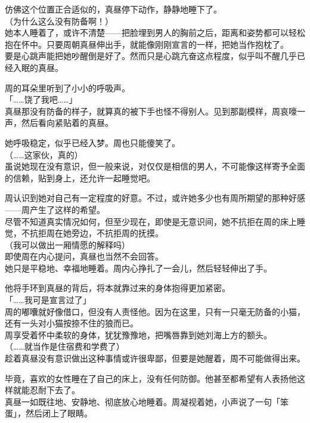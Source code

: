 仿佛这个位置正合适似的，真昼停下动作，静静地睡下了。\\

（为什么这么没有防备啊！）\\

她本人睡着了，或许不清楚——把脸埋到男人的胸前之后，距离和姿势都可以轻松抱在怀中。只要周朝真昼伸出手，就能像刚刚宣言的一样，把她当作抱枕了。\\

要是心跳声能把她吵醒倒是好了。然而只是心跳亢奋这点程度，似乎叫不醒几乎已经入眠的真昼。

周的耳朵里听到了小小的呼吸声。\\

「……饶了我吧……」\\

真昼那没有防备的样子，就算真的被下手也怪不得别人。见到那副模样，周哀嚎一声，然后看向紧贴着的真昼。

她呼吸稳定，似乎已经入梦。周也只能傻笑了。\\

（……这家伙，真的）\\

虽说她现在没有意识，但一般来说，对仅仅是相信的男人，不可能像这样寄予全面的信赖，贴到身上，还允许一起睡觉吧。

周认识到她对自己有一定程度的好意。不过，或许她多少也有周所期望的那种好感——周产生了这样的希望。\\

尽管不知道真实情况如何，但至少现在，即使是无意识间，她不抗拒在周的床上睡觉，不抗拒周在她旁边，不抗拒周的抚摸。\\

（我可以做出一厢情愿的解释吗）\\

即使周在内心提问，真昼也当然不会回答。\\

她只是平稳地、幸福地睡着。周内心挣扎了一会儿，然后轻轻伸出了手。

他将手环到真昼的背后，将本就靠过来的身体抱得更加紧密。\\

「……我可是宣言过了」\\

周的嘟囔就好像借口，但没有人责怪他。因为在这里，只有一只毫无防备的小猫，还有一头对小猫按捺不住的狼而已。\\

周享受着怀中柔软的身体，犹犹豫豫地，把嘴唇靠到她刘海上方的额头。\\

（……就当作是住宿费和学费了）\\

趁着真昼没有意识做出这种事情或许很卑鄙，但要是她醒着，周不可能做得出来。

毕竟，喜欢的女性睡在了自己的床上，没有任何防御。他甚至都希望有人表扬他这样就能忍耐下去了。\\

真昼一如既往地、安静地、彻底放心地睡着。周凝视着她，小声说了一句「笨蛋」，然后闭上了眼睛。


